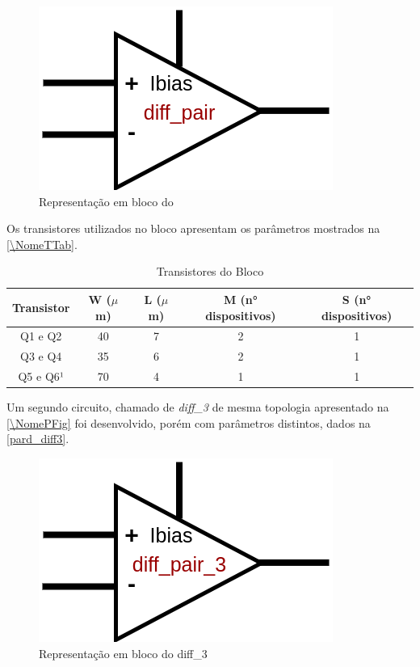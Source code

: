 \begin{figure}[htb]
 \centering
    \centering
    \caption{Representa{\c c}\~ao em bloco do \NomeBloco} \label{\NomeSFig}
    \includegraphics[scale=0.4]{Circuitos/diff_pair_block.png}
\end{figure}

Os transistores utilizados no bloco \NomeBloco{} apresentam os par\^ametros mostrados na \autoref{\NomeTTab}.

\begin{table}[htbp]
\caption{Transistores do Bloco \NomeBloco}
\label{\NomeTTab}
\centering
\begin{tabular}{ccccc}
\toprule
Transistor & W ($\mu$m)  & L ($\mu$m)           & M (n° dispositivos) & S (n° dispositivos)\\
\midrule \midrule
Q1 e Q2 & 40 & 7 & 2 & 1\\
\midrule
Q3 e Q4 & 35 & 6 & 2 & 1\\
\midrule
Q5 e Q6¹ & 70 & 4 & 1 & 1\\

\bottomrule
\end{tabular}
\end{table}

Um segundo circuito, chamado de \emph{diff\_3} de mesma topologia apresentado na \autoref{\NomePFig} foi desenvolvido, por\'em com par\^ametros distintos, dados na \autoref{pard_diff3}.

\begin{figure}[htb]
 \centering
    \centering
    \caption{Representa{\c c}\~ao em bloco do diff\_3} \label{\NomeSFig}
    \includegraphics[scale=0.4]{Circuitos/diff_pair_3_block.png}
\end{figure}

